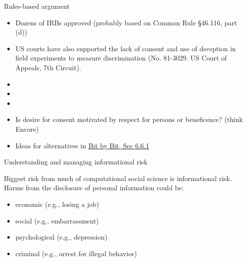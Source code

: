 \documentclass{beamer}
\begin{document}
\begin{frame}

Rules-based argument
\begin{itemize}
\item Dozens of IRBs approved (probably based on Common Rule §46.116, part (d))
\pause
\item US courts have also supported the lack of consent and use of deception in field experiments to measure discrimination (No. 81-3029.
US Court of Appeals, 7th Circuit).
\end{itemize}

\end{frame}
\begin{frame}

\begin{itemize}
\item {}
\item {}
\item {}
\end{itemize}

\end{frame}
\begin{frame}

\begin{itemize}
\item Is desire for consent motivated by respect for persons or beneficence? (think Encore)
\pause
\item Ideas for alternatives in \href{https://www.bitbybitbook.com/en/1st-ed/ethics/dilemmas/consent/}{Bit by Bit, Sec 6.6.1}
\end{itemize}

\end{frame}
\begin{frame}

\begin{center}
\Large{Understanding and managing informational risk}
\end{center}

\end{frame}
\begin{frame}

Biggest risk from much of computational social science is informational risk.  Harms from the disclosure of personal information could be: 

\begin{itemize}
\item economic (e.g., losing a job)
\item social (e.g., embarrassment)
\item psychological (e.g., depression)
\item criminal (e.g., arrest for illegal behavior)
\end{itemize}

\end{frame}
\end{document}

